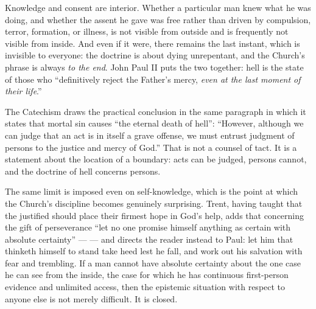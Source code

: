 Knowledge and consent are interior. Whether a particular man knew what he was doing, and whether the assent he gave was free rather than driven by compulsion, terror, formation, or illness, is not visible from outside and is frequently not visible from inside. And even if it were, there remains the last instant, which is invisible to everyone: the doctrine is about dying unrepentant, and the Church's phrase is always \emph{to the end}. John Paul II puts the two together: hell is the state of those who ``definitively reject the Father's mercy, \emph{even at the last moment of their life}.''

The Catechism draws the practical conclusion in the same paragraph in which it states that mortal sin causes ``the eternal death of hell'': ``However, although we can judge that an act is in itself a grave offense, we must entrust judgment of persons to the justice and mercy of God.'' That is not a counsel of tact. It is a statement about the location of a boundary: acts can be judged, persons cannot, and the doctrine of hell concerns persons.

The same limit is imposed even on self-knowledge, which is the point at which the Church's discipline becomes genuinely surprising. Trent, having taught that the justified should place their firmest hope in God's help, adds that concerning the gift of perseverance ``let no one promise himself anything as certain with absolute certainty'' ---  --- and directs the reader instead to Paul: let him that thinketh himself to stand take heed lest he fall, and work out his salvation with fear and trembling. If a man cannot have absolute certainty about the one case he can see from the inside, the case for which he has continuous first-person evidence and unlimited access, then the epistemic situation with respect to anyone else is not merely difficult. It is closed.

